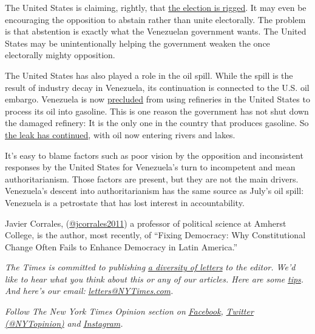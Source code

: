 The United States is claiming, rightly, that
\href{https://www.reuters.com/article/us-venezuela-politics/us-accuses-venezuelas-maduro-of-seeking-to-rig-upcoming-vote-idUSKBN23M2OJ}{the
election is rigged}. It may even be encouraging the opposition to
abstain rather than unite electorally. The problem is that abstention is
exactly what the Venezuelan government wants. The United States may be
unintentionally helping the government weaken the once electorally
mighty opposition.

The United States has also played a role in the oil spill. While the
spill is the result of industry decay in Venezuela, its continuation is
connected to the U.S. oil embargo. Venezuela is now
\href{https://www.washingtonpost.com/world/the_americas/venezuela-crisis-oil-gas-shortage-maduro-guaido/2020/04/15/19fd9864-7daa-11ea-84c2-0792d8591911_story.html}{precluded}
from using refineries in the United States to process its oil into
gasoline. This is one reason the government has not shut down the
damaged refinery: It is the only one in the country that produces
gasoline. So
\href{https://www.cambio16.com/derrame-de-petroleo-en-venezuela-aun-no-ha-cesado/}{the
leak has continued}, with oil now entering rivers and lakes.

It's easy to blame factors such as poor vision by the opposition and
inconsistent responses by the United States for Venezuela's turn to
incompetent and mean authoritarianism. Those factors are present, but
they are not the main drivers. Venezuela's descent into authoritarianism
has the same source as July's oil spill: Venezuela is a petrostate that
has lost interest in accountability.

Javier Corrales,
(\href{https://twitter.com/jcorrales2011}{@jcorrales2011}) a professor
of political science at Amherst College, is the author, most recently,
of ``Fixing Democracy: Why Constitutional Change Often Fails to Enhance
Democracy in Latin America.''

\emph{The Times is committed to publishing}
\href{https://www.nytimes3xbfgragh.onion/2019/01/31/opinion/letters/letters-to-editor-new-york-times-women.html}{\emph{a
diversity of letters}} \emph{to the editor. We'd like to hear what you
think about this or any of our articles. Here are some}
\href{https://help.nytimes3xbfgragh.onion/hc/en-us/articles/115014925288-How-to-submit-a-letter-to-the-editor}{\emph{tips}}\emph{.
And here's our email:}
\href{mailto:letters@NYTimes.com}{\emph{letters@NYTimes.com}}\emph{.}

\emph{Follow The New York Times Opinion section on}
\href{https://www.facebookcorewwwi.onion/nytopinion}{\emph{Facebook}}\emph{,}
\href{http://twitter.com/NYTOpinion}{\emph{Twitter (@NYTopinion)}}
\emph{and}
\href{https://www.instagram.com/nytopinion/}{\emph{Instagram}}\emph{.}

